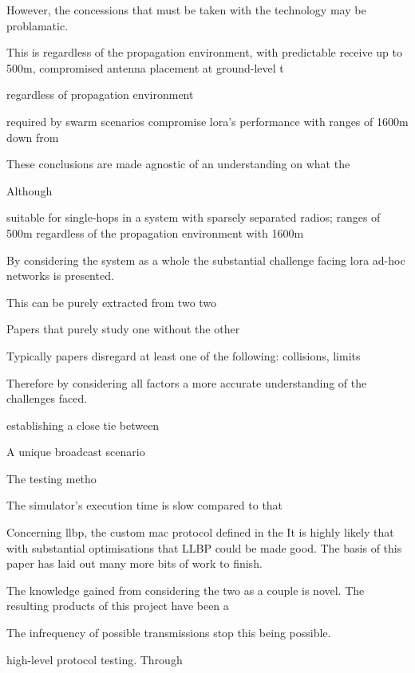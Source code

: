 However, the concessions that must be taken with the technology may be problamatic.


This is regardless of the propagation environment, with predictable receive  up to 500m, compromised antenna placement at ground-level t


regardless of propagation environment 

 required by swarm scenarios compromise \ac{lora}'s performance with ranges of 1600m down from 

These conclusions are made agnostic of an understanding on what the  

Although 





 suitable for single-hops in a system with sparsely separated radios; ranges of 500m regardless of the propagation environment with 1600m 


By considering the system as a whole the substantial challenge facing \ac{lora} ad-hoc networks is presented. 


This can be purely extracted from
 two two 



Papers that purely study one without the other 


Typically papers disregard at least one of the following: collisions, limits 

Therefore by considering all factors a more accurate understanding of the challenges faced.


 establishing a close tie between 


A unique broadcast scenario 


The testing metho


The simulator's execution time is slow compared to that 

Concerning \ac{llbp}, the custom \ac{mac} protocol defined in the  
It is highly likely that with substantial optimisations that LLBP could be made good.
The basis of this paper has laid out many more bits of work to finish.

The knowledge gained from considering the two as a couple is novel.
The resulting products of this project have been a 





The infrequency of possible transmissions stop this being possible.




 high-level protocol testing. Through

